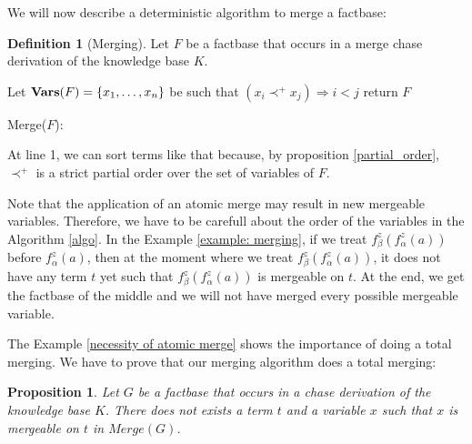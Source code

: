 \documentclass{article}
\newtheorem{proposition}{Proposition}[section]
\theoremstyle{definition}
\newtheorem{definition}{Definition}[section]
\theoremstyle{remark}
\newcommand{\Vars}{\textbf{Vars}}
\newcommand{\Merge}{\textit{Merge}}
\begin{document}
We will now describe a deterministic algorithm to merge a factbase:

\begin{definition}[Merging]
Let $F$ be a factbase that occurs in a merge chase derivation of the knowledge base $K$.

\begin{algorithm}[H] \label{algo}
\SetAlgoLined


    Let $\textbf{\Vars}(F) = \{x_1,\ldots, x_n\}$ be such that $(x_i \prec^+ x_j) \Rightarrow i < j$ \;
return $F$
\caption{Merge($F$):}


\end{algorithm}
At line 1, we can sort terms like that because, by proposition \ref{partial_order}, $\prec^+$ is a strict partial order over the set of variables of $F$.
\end{definition}



Note that the application of an atomic merge may result in new mergeable variables. Therefore, we have to be carefull about the order of the variables in the Algorithm \ref{algo}. In the Example \ref{example: merging}, if we treat $f_\beta^z(f_\alpha^z(a))$ before $f_\alpha^z(a)$, then at the moment where we treat $f_\beta^z(f_\alpha^z(a))$, it does not have any term $t$ yet such that $f_\beta^z(f_\alpha^z(a))$ is mergeable on $t$. At the end, we get the factbase of the middle and we will not have merged every possible mergeable variable.


The Example \ref{necessity of atomic merge} shows the importance of doing a total merging. We have to prove that our merging algorithm does a total merging:

\begin{proposition}\label{no_more_siblings}
Let $G$ be a factbase that occurs in a chase derivation of the knowledge base $K$. There does not exists a term $t$ and a variable $x$ such that $x$ is mergeable on $t$ in $\Merge(G)$.
\end{proposition}
\end{document}
